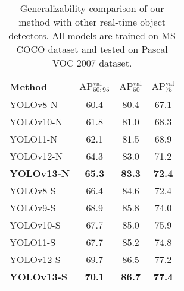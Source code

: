 \begin{table}[!tp]
\centering
\caption{Generalizability comparison of our method with other real-time object detectors. All models are trained on MS COCO dataset and tested on Pascal VOC 2007 dataset.}
\label{tab:voc_compare}
\renewcommand{\arraystretch}{1.15}
\setlength{\tabcolsep}{5.6mm}
\begin{tabular}{lccc}
\toprule
\textbf{Method} & \textbf{$\text{AP}_{50:95}^\text{val}$} & \textbf{$\text{AP}_{50}^\text{val}$} & \textbf{$\text{AP}_{75}^\text{val}$} \\
\midrule
YOLOv8-N~\cite{yolov8}            & 60.4& 80.4& 67.1\\
YOLOv10-N~\cite{yolov10}           & 61.8& 81.0& 68.3\\
YOLO11-N~\cite{yolo11}            & 62.1& 81.5& 68.9\\
YOLOv12-N~\cite{yolov12}           & 64.3& 83.0& 71.2\\
\rowcolor{blue!10}
\textbf{YOLOv13-N}        & \textbf{65.3}& \textbf{83.3}& \textbf{72.4}\\
\midrule
YOLOv8-S~\cite{yolov8}            & 66.4& 84.6& 72.4\\
YOLOv9-S~\cite{yolov9}            & 68.9& 85.8& 74.0\\
YOLOv10-S~\cite{yolov10}           & 67.7& 85.0& 75.9\\
YOLO11-S~\cite{yolo11}            & 67.7& 85.2& 74.8\\
YOLOv12-S~\cite{yolov12}           & 69.7& 86.5& 77.2\\
\rowcolor{blue!10}
\textbf{YOLOv13-S}       & \textbf{70.1} & \textbf{86.7}& \textbf{77.4}\\
\bottomrule
\end{tabular}
\vspace{-0.5cm}
\end{table}